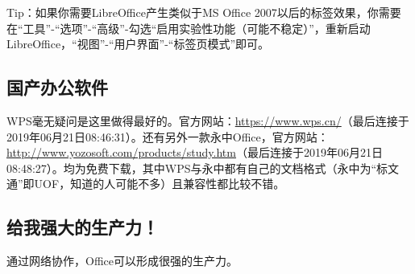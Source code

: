 Tip：如果你需要LibreOffice产生类似于MS Office 2007以后的标签效果，你需要在“工具”-“选项”-“高级”-勾选“启用实验性功能（可能不稳定）”，重新启动LibreOffice，“视图”-“用户界面”-“标签页模式”即可。
\subsection{国产办公软件}
WPS毫无疑问是这里做得最好的。官方网站：\url{https://www.wps.cn/}（最后连接于2019年06月21日08:46:31）。还有另外一款永中Office，官方网站：\url{http://www.yozosoft.com/products/study.htm}（最后连接于2019年06月21日08:48:27）。均为免费下载，其中WPS与永中都有自己的文档格式（永中为“标文通”即UOF，知道的人可能不多）且兼容性都比较不错。
\subsection{给我强大的生产力！}
\label{sec:OneDrive}通过网络协作，Office可以形成很强的生产力。
